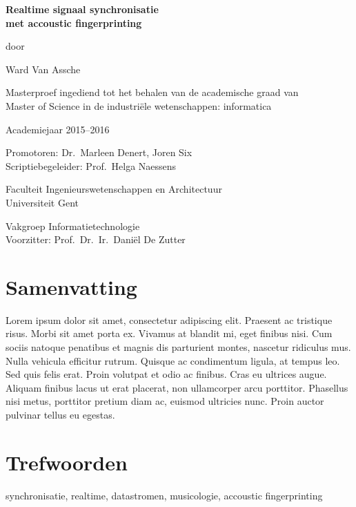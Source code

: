 
\newpage

{
\setlength{\baselineskip}{14pt}
\setlength{\parindent}{0pt}
\setlength{\parskip}{8pt}

\begin{center}

\noindent \textbf{\huge
Realtime signaal synchronisatie\\[8pt]
met accoustic fingerprinting
}

door 

Ward Van Assche

Masterproef ingediend tot het behalen van de academische graad van\\
Master of Science in de industriële wetenschappen: informatica

Academiejaar 2015--2016

Promotoren: Dr.~Marleen Denert, Joren Six\\
Scriptiebegeleider: Prof.~Helga Naessens

Faculteit Ingenieurswetenschappen en Architectuur\\
Universiteit Gent

Vakgroep Informatietechnologie\\
Voorzitter: Prof.~Dr.~Ir.~Dani\"{e}l De Zutter


\end{center}

\section*{Samenvatting}


Lorem ipsum dolor sit amet, consectetur adipiscing elit. Praesent ac tristique risus. Morbi sit amet porta ex. Vivamus at blandit mi, eget finibus nisi. Cum sociis natoque penatibus et magnis dis parturient montes, nascetur ridiculus mus. Nulla vehicula efficitur rutrum. Quisque ac condimentum ligula, at tempus leo. Sed quis felis erat. Proin volutpat et odio ac finibus. Cras eu ultrices augue. Aliquam finibus lacus ut erat placerat, non ullamcorper arcu porttitor. Phasellus nisi metus, porttitor pretium diam ac, euismod ultricies nunc. Proin auctor pulvinar tellus eu egestas.




\section*{Trefwoorden}


synchronisatie, realtime, datastromen, musicologie, accoustic fingerprinting

}

\newpage %
